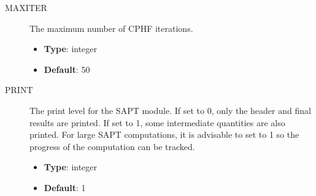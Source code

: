 \documentclass[letterpaper,10pt,english]{sphinxmanual}
\begin{document}
\begin{description}
\item[{MAXITER}] \leavevmode{}\label{index:term-maxiter}
The maximum number of CPHF iterations.
\begin{itemize}
\item {} 
\textbf{Type}: integer

\item {} 
\textbf{Default}: 50

\end{itemize}

\end{description}
\begin{description}
\item[{PRINT}] \leavevmode{}\label{index:term-print}
The print level for the SAPT module. If set to 0, only the header
and final results are printed. If set to 1, some intermediate
quantities are also printed. For large SAPT computations, it is
advisable to set to 1 so the progress of the computation can be
tracked.
\begin{itemize}
\item {} 
\textbf{Type}: integer

\item {} 
\textbf{Default}: 1

\end{itemize}

\end{description}
\end{document}
